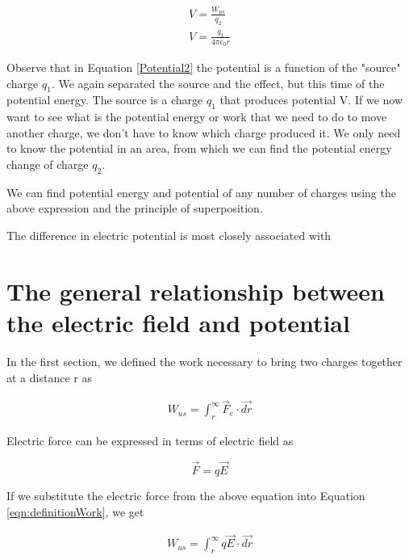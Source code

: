 \documentclass{ximera}
\begin{document}
\begin{eqnarray}
V=\frac{W_{us}}{q_2} \\
V=\frac{q_1}{4 \pi \epsilon_0 r} \label{Potential2}
\end{eqnarray}

Observe that in Equation \ref{Potential2} the potential is a function of the "source" charge $q_1$. We again separated the source and the effect, but this time of the potential energy. The source is a charge $q_1$ that produces potential V. If we now want to see what is the potential energy or work that we need to do to move another charge, we don't have to know which charge produced it. We only need to know the potential in an area, from which we can find the potential energy change of charge $q_2$. 

We can find potential energy and potential of any number of charges using the above expression and the principle of superposition. 


\begin{question}  
The difference in electric potential is most closely associated with 
\begin{multipleChoice}  
\end{multipleChoice}  
\end{question}

\section{The general relationship between the electric field and potential}

In the first section, we defined the work necessary to bring two charges together at a distance r as

\begin{eqnarray}
W_{us}=  \int_{r}^{\infty} \vec{F}_{e} \cdot \vec{dr}\label{eqn:definitionWork} 
\end{eqnarray}

Electric force can be expressed in terms of electric field as

\begin{equation}
\vec{F}=q \vec{E}
\end{equation}

If we substitute the electric force from the above equation into Equation \ref{eqn:definitionWork}, we get 

\begin{eqnarray}
W_{us}=  \int_{r}^{\infty} q \vec{E} \cdot \vec{dr}
\end{eqnarray}
\end{document}
